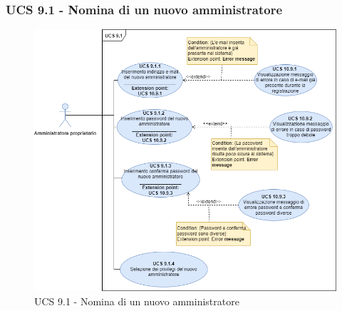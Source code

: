 \subsubsection{UCS 9.1 - Nomina di un nuovo amministratore}%

\begin{figure}[h!]
  \centering
    \includegraphics[scale=0.5]{Sezioni/UseCase/Immagini/UCS9.1.png}
  \caption{UCS 9.1 - Nomina di un nuovo amministratore}
\end{figure}

